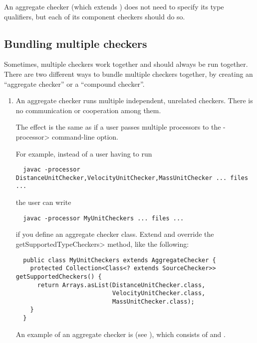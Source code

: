 An aggregate checker (which extends
) does not need to specify its
type qualifiers, but each of its component checkers should do so.




\subsection{Bundling multiple checkers\label{bundling-multiple-checkers}}

Sometimes, multiple checkers work together and should always be run
together.  There are two different ways to bundle multiple checkers
together, by creating an ``aggregate checker'' or a ``compound checker''.


\begin{enumerate}
\item
An aggregate checker runs multiple independent, unrelated checkers.  There
is no communication or cooperation among them.

The effect is the same as if a user passes
multiple processors to the \<-processor> command-line option.

For example, instead of a user having to run

\begin{Verbatim}
  javac -processor DistanceUnitChecker,VelocityUnitChecker,MassUnitChecker ... files ...
\end{Verbatim}

\noindent
the user can write

\begin{Verbatim}
  javac -processor MyUnitCheckers ... files ...
\end{Verbatim}

\noindent
if you define an aggregate checker class.  Extend  and override
the \<getSupportedTypeCheckers> method, like the following:

\begin{Verbatim}
  public class MyUnitCheckers extends AggregateChecker {
    protected Collection<Class<? extends SourceChecker>> getSupportedCheckers() {
      return Arrays.asList(DistanceUnitChecker.class,
                           VelocityUnitChecker.class,
                           MassUnitChecker.class);
    }
  }
\end{Verbatim}

An example of an aggregate checker is 
(see ), which consists of
 and
.


\end{enumerate}

